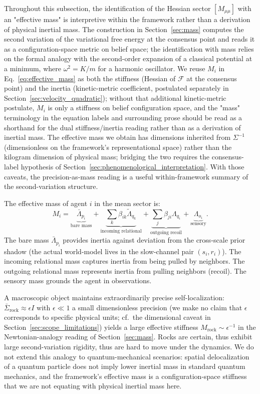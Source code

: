 \documentclass[11pt]{article}
\begin{document}
Throughout this subsection, the identification of the Hessian sector $[M_{\mu\mu}]$ with an "effective mass" is interpretive within the framework rather than a derivation of physical inertial mass. The construction in Section~\ref{sec:mass} computes the second variation of the variational free energy at the consensus point and reads it as a configuration-space metric on belief space; the identification with mass relies on the formal analogy with the second-order expansion of a classical potential at a minimum, where $\omega^2 = K/m$ for a harmonic oscillator. We reuse $M_i$ in Eq.~\eqref{eq:effective_mass} as both the stiffness (Hessian of $\mathcal{F}$ at the consensus point) and the inertia (kinetic-metric coefficient, postulated separately in Section~\ref{sec:velocity_quadratic}); without that additional kinetic-metric postulate, $M_i$ is only a stiffness on belief configuration space, and the "mass" terminology in the equation labels and surrounding prose should be read as a shorthand for the dual stiffness/inertia reading rather than as a derivation of inertial mass. The effective mass we obtain has dimensions inherited from $\Sigma^{-1}$ (dimensionless on the framework's representational space) rather than the kilogram dimension of physical mass; bridging the two requires the consensus-label hypothesis of Section~\ref{sec:phenomenological_interpretation}. With those caveats, the precision-as-mass reading is a useful within-framework summary of the second-variation structure.

The effective mass of agent $i$ in the mean sector is:
\begin{equation}
M_i = \underbrace{\bar{\Lambda}_{p_i}}_{\text{bare mass}} + \underbrace{\sum_k \beta_{ik}\tilde{\Lambda}_{q_k}}_{\text{incoming relational}} + \underbrace{\sum_j \beta_{ji}\Lambda_{q_i}}_{\text{outgoing recoil}} + \underbrace{\Lambda_{o_i}}_{\text{sensory}}.
\label{eq:effective_mass}
\end{equation}
The bare mass $\bar{\Lambda}_{p_i}$ provides inertia against deviation from the cross-scale prior shadow (the actual world-model lives in the slow-channel pair $(s_i, r_i)$). The incoming relational mass captures inertia from being pulled by neighbors. The outgoing relational mass represents inertia from pulling neighbors (recoil). The sensory mass grounds the agent in observations.

A macroscopic object maintains extraordinarily precise self-localization: $\bar{\Sigma}_{\mathrm{rock}} \approx \epsilon I$ with $\epsilon \ll 1$ a small dimensionless precision (we make no claim that $\epsilon$ corresponds to specific physical units; cf.\ the dimensional caveat in Section~\ref{sec:scope_limitations}) yields a large effective stiffness $M_{\mathrm{rock}} \sim \epsilon^{-1}$ in the Newtonian-analogy reading of Section~\ref{sec:mass}. Rocks are certain, thus exhibit large second-variation rigidity, thus are hard to move under the dynamics. We do not extend this analogy to quantum-mechanical scenarios: spatial delocalization of a quantum particle does not imply lower inertial mass in standard quantum mechanics, and the framework's effective mass is a configuration-space stiffness that we are not equating with physical inertial mass here.
\end{document}
